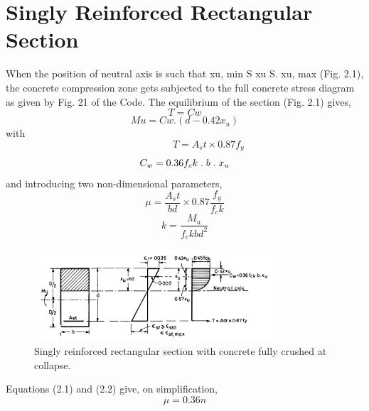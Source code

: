\section{Singly Reinforced Rectangular Section}
When the position of neutral axis is such that xu, min S xu S. xu, max (Fig. 2.1), the concrete
compression zone gets subjected to the full concrete stress diagram as given by Fig. 21 of the
Code. The equilibrium of the section (Fig. 2.1) gives,
\begin{equation}
T=Cw
\label{1}
\end{equation}
\begin{equation}
Mu=Cw.(d-0.42x_u)
\label{2}
\end{equation}
with
\begin{equation*}
\hspace{2cm} T=A_st \times 0.87f_y
\label{3}
\end{equation*}
\begin{equation*}
C_w=0.36f_ck\hspace{0.1cm}.\hspace{0.1cm} b\hspace{0.1cm} .\hspace{0.1cm} x_u
\label{4}
\end{equation*}
and introducing two non-dimensional parameters,
\begin{equation*}
\mu=\frac {A_st}{bd} \times 0.87\frac {f_y}{f_ck}
\end{equation*}
\begin{equation*}
k=\frac{M_u}{f_ckbd^2}
\end{equation*}
\begin{figure}
\centering
\includegraphics[width=0.8\textwidth]{images/ch2-1.png}
\caption{Singly reinforced rectangular section with concrete fully crushed at collapse.}
\label{fig:Singly reinforced section}
\end{figure}
\newpage
Equations (2.1) and (2.2) give, on simplification,
\begin{equation}
\mu = 0.36n
\end{equation}

